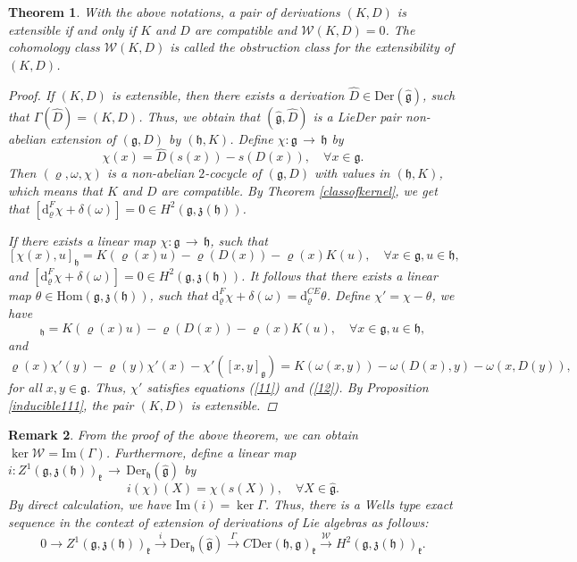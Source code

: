 \documentclass[12pt]{amsart}
\newtheorem{thm}{Theorem}[section]
\newtheorem{rmk}[thm]{Remark}
\newcommand {\emptycomment}[1]{}
\newcommand{\lon }{\,\rightarrow\,}
\newcommand{\g}{\mathfrak g}
\newcommand{\h}{\mathfrak h}
\newcommand{\huaW}{\mathcal{W}}
\newcommand{\frkk}{\mathfrak k}
\newcommand{\frkz}{\mathfrak z}
\newcommand{\dM}{\mathrm{d}}
\newcommand{\Hom}{\mathrm{Hom}}
\newcommand{\LD}{{\rm LieDer }}
\newcommand{\Der}{\mathrm{Der}}
\begin{document}
\begin{thm}
With the above notations, a pair of derivations $(K, D)$ is extensible if and only if $K$ and $D$ are compatible and $\huaW(K, D)=0$. The cohomology class $\huaW(K, D)$ is called the obstruction class for the extensibility of $(K, D)$. 
    \begin{proof}
        If $(K, D)$ is extensible, then there exists a derivation $\hat{D}\in\Der(\hat{\g})$, such that $\Gamma(\hat{D})=(K,D)$. 
        Thus, we obtain that $(\hat{\g},\hat{D})$ is a \LD pair non-abelian extension of $(\g,D)$ by $(\h,K)$. 
        Define $\chi:\g\lon\h$ by
        $$
        \chi(x)=\hat{D}(s(x))-s(D(x)), \quad \forall x\in\g.
        $$
        Then $(\varrho, \omega, \chi)$ is a non-abelian $2$-cocycle of $(\g, D)$ with values in $(\h, K)$, which means that $K$ and $D$ are compatible. By Theorem \ref{classofkernel}, we get that $[\dM^F_{\varrho}\chi+\delta(\omega)]=0\in H^2(\g,\frkz(\h))$.

        If there exists a linear map $\chi:\g\lon\h$, such that
       $$
       [\chi(x),u]_{\h}=K(\varrho(x)u)-\varrho(D(x))-\varrho(x)K(u), \quad\forall x\in\g, u\in\h,
       $$
       and $[\dM^F_{\varrho}\chi+\delta(\omega)]=0\in H^2(\g,\frkz(\h))$. It follows that there exists a linear map $\theta\in \Hom(\g,\frkz(\h))$, such that $\dM^F_{\varrho}\chi+\delta(\omega)=\dM^{CE}_{\varrho}\theta$. \emptycomment{i.e.,
        \begin{equation*}
            \varrho(x)\chi(y)-\varrho(y)\chi(x)-\chi([x, y]_\g)+\omega(D(x), y)+\omega(x, D(y))-K(\omega(x, y))=\varrho(x)\theta(y)-\varrho(y)\theta(x)-\theta([x, y]_\g),
        \end{equation*}
        for all $x, y\in\g$.} Define $\chi'=\chi-\theta$, we have
        \begin{equation*}
          [\chi'(x),u]_{\h}=K(\varrho(x)u)-\varrho(D(x))-\varrho(x)K(u), \quad \forall x\in\g, u\in\h,
        \end{equation*}
        and
        \begin{equation*}
            \varrho(x)\chi'(y)-\varrho(y)\chi'(x)-\chi'([x, y]_\g)=K(\omega(x, y))-\omega(D(x), y)-\omega(x, D(y)),
        \end{equation*}
        for all $x, y\in\g$. Thus, $\chi'$ satisfies equations (\ref{11}) and (\ref{12}). By Proposition \ref{inducible111}, the pair $(K,D)$ is extensible.
    \end{proof}
\end{thm}
\begin{rmk}
	From the proof of the above theorem, we can obtain $\ker\huaW=\mathrm{Im}(\Gamma)$. Furthermore, define a linear map $i: Z^{1}(\g,\frkz(\h))_{\frkk}\lon \Der_{\h}(\hat{\g})$ by $$
	i(\chi)(X)=\chi(s(X)), \quad \forall X\in\hat{\g}.
	$$
	By direct calculation, we have $\mathrm{Im}(i)=\ker\Gamma$. 
	Thus, there is a {\rm Wells} type exact sequence in the context of extension of derivations of Lie algebras as follows:
	$$
	0\longrightarrow Z^{1}(\g,\frkz(\h))_{\frkk}\overset{i}\longrightarrow \Der_{\h}(\hat{\g}) \overset{\Gamma}\longrightarrow C\Der(\h,\g)_{\frkk}\overset{\huaW}\longrightarrow H^2(\g,\frkz(\h))_{\frkk}.
	$$
	\end{rmk}
\end{document}
